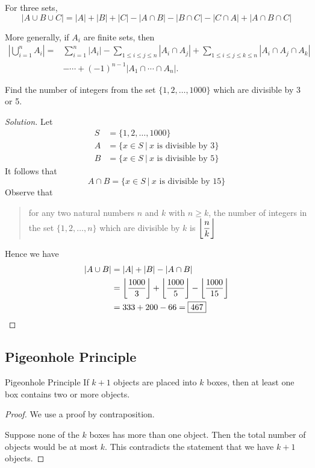For three sets,  \[ |A \cup B \cup C| = |A| + |B| + |C| - |A \cap B| - |B \cap C| - |C \cap A| + |A \cap B \cap C| \]

More generally, if $A_i$ are finite sets, then
\begin{equation} 
\begin{aligned} |\bigcup_{i=1}^{n} A_i| = &\sum_{i=1}^{n} |A_i| - \sum_{1 \le i \le j \le n} |A_i \cap A_j| + \sum_{1 \le i \le j \le k \le n} |A_i \cap A_j \cap A_k|\\
&- \cdots + (-1)^{n-1} |A_1 \cap \cdots \cap A_n|. 
\end{aligned} 
\end{equation}

\begin{exmp}{}{}
Find the number of integers from the set $\{1,2,\dots,1000\}$ which are divisible by 3 or 5.
\end{exmp}

\begin{proof}[Solution]
Let
\begin{align*}
S &= \{1,2,\dots,1000\} \\
A &= \{x\in S\:|\:x\text{ is divisible by 3}\} \\
B &= \{x\in S\:|\:x\text{ is divisible by 5}\}
\end{align*}
It follows that \[ A\cap B = \{x\in S\:|\:x\text{ is divisible by 15}\} \]
Observe that
\begin{quote}
for any two natural numbers $n$ and $k$ with $n\ge k$, the number of integers in the set $\{1,2,\dots,n\}$ which are divisible by $k$ is $\left\lfloor \dfrac{n}{k} \right\rfloor$
\end{quote}
Hence we have 
\begin{align*}
|A\cup B| &= |A| + |B| - |A\cap B| \\
&= \left\lfloor \frac{1000}{3} \right\rfloor + \left\lfloor \frac{1000}{5} \right\rfloor - \left\lfloor \frac{1000}{15} \right\rfloor \\
&= 333 + 200 - 66 = \boxed{467}
\end{align*}
\end{proof}

\subsection{Pigeonhole Principle}
\begin{thrm}{Pigeonhole Principle}{}
If $k+1$ objects are placed into $k$ boxes, then at least one box contains two or more objects. 
\end{thrm}

\begin{proof}
We use a proof by contraposition.

Suppose none of the $k$ boxes has more than one object. Then the total number of objects would be at most $k$. This contradicts the statement that we have $k + 1$ objects.
\end{proof}

